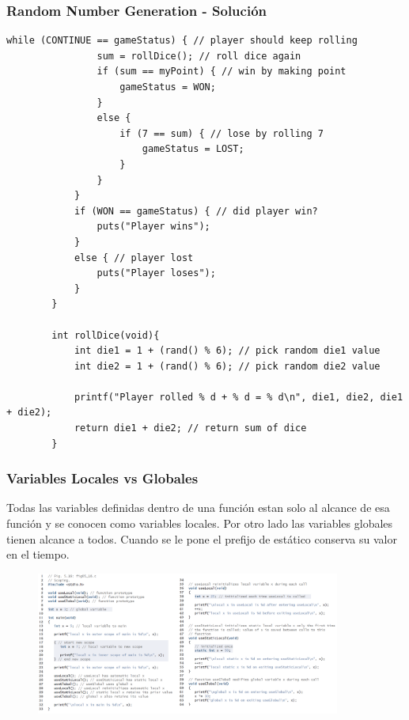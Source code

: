 \documentclass[10.5pt,scale=1.0,t,aspectratio=169,hyperref={pdfpagelabels=false}]{beamer}
\begin{document}
\begin{frame}[fragile]
	\frametitle{Random Number Generation - Solución}
	\begin{lstlisting}[style=CStyle]
		    while (CONTINUE == gameStatus) { // player should keep rolling
				sum = rollDice(); // roll dice again
				if (sum == myPoint) { // win by making point
					gameStatus = WON;
				}
				else {
					if (7 == sum) { // lose by rolling 7
						gameStatus = LOST;
					}
				}
			}
			if (WON == gameStatus) { // did player win?
				puts("Player wins");
			}
			else { // player lost
				puts("Player loses");
			}
		}
		
		int rollDice(void){
			int die1 = 1 + (rand() % 6); // pick random die1 value
			int die2 = 1 + (rand() % 6); // pick random die2 value
			
			printf("Player rolled % d + % d = % d\n", die1, die2, die1 + die2);
			return die1 + die2; // return sum of dice
		}
		\end{lstlisting}
	\end{frame}
\begin{frame}
	\frametitle{Variables Locales vs Globales}
	Todas las variables definidas dentro de una función estan solo al alcance de esa función y se conocen como variables locales. Por otro lado las variables globales tienen alcance a todos. Cuando se le pone el prefijo de estático conserva su valor en el tiempo. 
	\begin{figure}
		\centering
		\includegraphics[width=10cm]{GlobalLocal}
	\end{figure}
\end{frame}
\end{document}
